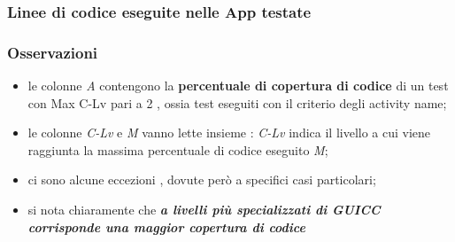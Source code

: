 \documentclass[12pt]{beamer}
\begin{document}
{

\begin{frame}
\frametitle{Linee di codice eseguite nelle App testate}



\end{frame}
}

{

\begin{frame}
\frametitle{Osservazioni}

\begin{itemize}
\item le colonne \textit{A} contengono la \textbf{percentuale di copertura di codice} di un test con Max C-Lv pari a 2 , ossia test eseguiti con il criterio degli activity name;

\item le colonne \textit{C-Lv} e \textit{M} vanno lette insieme : \textit{C-Lv} indica il livello a cui viene raggiunta la massima percentuale di codice eseguito \textit{M};

\item ci sono alcune eccezioni , dovute per\`o a specifici casi particolari;

\item si nota chiaramente che \emph{ \textbf{a livelli pi\`u specializzati di GUICC corrisponde una maggior copertura di codice} }
\end{itemize}


\end{frame}
}
\end{document}
